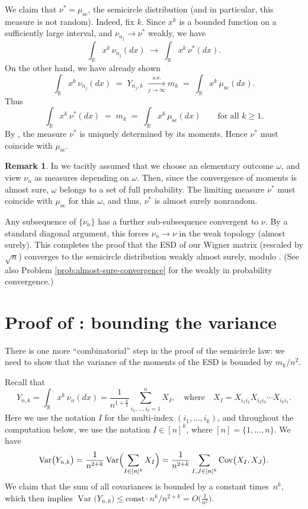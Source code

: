 \documentclass[letterpaper,11pt,oneside,reqno]{article}
\numberwithin{equation}{section}
\theoremstyle{definition}
\newtheorem{remark}[proposition]{Remark}
\begin{document}
We claim that \(\nu^*=\mu_{\mathrm{sc}}\), the semicircle distribution
(and in particular, this measure is not random).
Indeed, fix \(k\).  Since \(x^k\) is a bounded function on a sufficiently large interval, and \(\nu_{n_j}\to\nu^*\) weakly, we have
\[
\int_{\mathbb{R}} x^k\,\nu_{n_j}(dx) \;\to\;\int_{\mathbb{R}} x^k\,\nu^*(dx).
\]
On the other hand, we have already shown
\[
\int_{\mathbb{R}} x^k \, \nu_{n_j}(dx)
   \;=\;
   Y_{n_j,k}
   \;\xrightarrow[j\to\infty]{\text{a.s.}}
   m_k
   \;=\;\int_{\mathbb{R}} x^k\,\mu_{\mathrm{sc}}(dx).
\]
Thus
\[
\int_{\mathbb{R}} x^k\,\nu^*(dx)
   \;=\;
   m_k
   \;=\;
   \int_{\mathbb{R}} x^k\,\mu_{\mathrm{sc}}(dx)
   \qquad
   \text{for all $k\ge1$.}
\]
By , the measure \(\nu^*\) is uniquely
determined by its moments.  Hence \(\nu^*\) must coincide
with \(\mu_{\mathrm{sc}}\).

\begin{remark}
	In 
	we tacitly assumed that we choose an elementary outcome $\omega$,
	and view $\nu_n$ as measures depending on $\omega$.
	Then, since the convergence of moments is almost sure,
	$\omega$ belongs to a set of full probability.
	The limiting measure $\nu^*$ must coincide
	with $\mu_{\mathrm{sc}}$ for this $\omega$,
	and thus, $\nu^*$ is almost surely nonrandom.
\end{remark}

Any subsequence of \(\{\nu_n\}\) has a further
sub-subsequence convergent to \(\nu\).  By a standard
diagonal argument, this forces \(\nu_n\to\nu\) in the weak
topology (almost surely).  This completes the proof that the ESD of our
Wigner matrix (rescaled by \(\sqrt{n}\)) converges to the
semicircle distribution weakly almost surely,
modulo .
(See also Problem \ref{prob:almost-sure-convergence}
for the weakly in probability convergence.)


\section{Proof of : bounding the variance}
\label{sub:variance-bound-proof}

There is one more ``combinatorial'' step in the proof of the
semicircle law: we need to show that the variance of the
moments of the ESD is bounded by \(m_k/n^2\).

Recall that
\[
	Y_{n,k}
	=\int_{\mathbb{R}}x^k\,\nu_n(dx)
	=\frac{1}{n^{1+\frac{k}{2}}}
	\sum_{i_1,\ldots,i_k=1}^{n} X_I,
	\quad
	\text{where}
	\quad
	X_I=X_{i_1 i_2}X_{i_2 i_3}\cdots X_{i_{k}i_1}.
\]
Here we use the notation $I$ for the multi-index $(i_1,\ldots,i_k)$,
and throughout the computation below,
we use the notation $I\in[n]^k$,
where $[n]=\{1,\ldots,n\}$.
We have
\[
\operatorname{\mathrm{Var}}\bigl(Y_{n,k}\bigr)
	=
	\frac{1}{n^{2+k}}
	\operatorname{\mathrm{Var}}
	\Bigl(\sum_{I\in[n]^k}X_I\Bigr)
	=
	\frac{1}{n^{2+k}}
	\sum_{I,J\in[n]^k}
	\operatorname{\mathrm{Cov}}\bigl(X_I,X_J\bigr).
\]
We claim that the sum of all covariances is bounded by a constant times~\(n^k\), which then implies
\(\operatorname{\mathrm{Var}}\bigl(Y_{n,k}\bigr)\le \mathrm{const}\cdot n^k / n^{2+k}=O\bigl(\tfrac{1}{n^2}\bigr)\).
\end{document}
